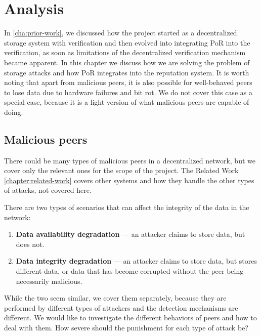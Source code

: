 \chapter{Analysis}
\label{chapter:analysis}

In \autoref{cha:prior-work}, we discussed how the project started as a decentralized
storage system with verification and then evolved into integrating PoR into the verification,
as soon as limitations of the decentralized verification mechanism became apparent.
In this chapter we discuss how we are solving the problem of storage attacks
and how PoR integrates into the reputation system.
It is worth noting that apart from malicious peers, it is also possible for well-behaved peers to
lose data due to hardware failures and bit rot.
We do not cover this case as a special case, because it is a light version of what malicious
peers are capable of doing.

\section{Malicious peers}

There could be many types of malicious peers in a decentralized network,
but we cover only the relevant ones for the scope of the project.
The Related Work \autoref{chapter:related-work} covers other systems and
how they handle the other types of attacks, not covered here.

There are two types of scenarios that can affect the integrity of the data in the network:
\begin{enumerate}
    \item \textbf{Data availability degradation} --- an attacker claims to store data, but does not.
    \item \textbf{Data integrity degradation} --- an attacker claims to store data, but stores different data, or
        data that has become corrupted without the peer being necessarily malicious.
\end{enumerate}

While the two seem similar, we cover them separately, because they are performed by different types of attackers
and the detection mechanisms are different.
We would like to investigate the different behaviors of peers and how to deal with them.
How severe should the punishment for each type of attack be?

